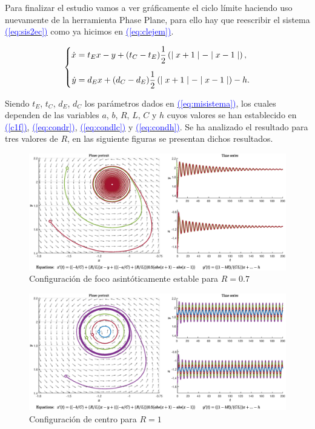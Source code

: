 \documentclass[12pt,a4paper]{report} %
\newcommand{\eref}[1]{\hyperref[#1]{\textcolor{blue}{(\ref*{#1})}}}
\begin{document}
	\newpage
	
	Para finalizar el estudio vamos a ver gráficamente el ciclo límite haciendo uso nuevamente de la herramienta Phase Plane, para ello hay que reescribir el sistema \eref{eq:sis2ec} como ya hicimos en \eref{eq:clejem}.
	
	\begin{equation}
		\label{eq:clejemsis}
		\scalebox{1}{$\displaystyle
			\left\{
			\begin{aligned}
				\dot{x}&=t_Ex-y+(t_C-t_E)\frac{1}{2}\left( \mid x+1 \mid - \mid x-1 \mid \right),
				\\[2mm]
				\dot{y}&=d_Ex+(d_C-d_E)\frac{1}{2}\left( \mid x+1 \mid - \mid x-1 \mid \right)-h.
			\end{aligned}
			\right. 
			$}
	\end{equation}\smallskip
	
	\vspace{0.5cm}Siendo $t_E$, $t_C$, $d_E$, $d_C$ los parámetros dados en \eref{eq:misistema}, los cuales dependen de las variables $a$, $b$, $R$, $L$, $C$ y $h$ cuyos valores se han establecido en \eref{c1f}, \eref{eq:condr}, \eref{eq:condlc} y \eref{eq:condh}. Se ha analizado el resultado para tres valores de $R$, en las siguiente figuras se presentan dichos resultados.
	
	\begin{figure}[h]
		\centering
		\includegraphics[width=1\textwidth]{r0.7.eps}
		\caption{Configuración de foco asintóticamente estable para $R=0.7$}
		\label{fig:r0.7}
	\end{figure}
	\begin{figure}[h]
		\centering
		\includegraphics[width=1\textwidth]{r1.eps}
		\caption{Configuración de centro para $R=1$}
		\label{fig:r1}
	\end{figure}
	
\end{document}
